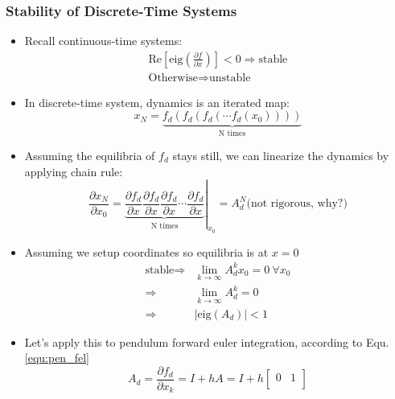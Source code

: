 \subsubsection{Stability of Discrete-Time Systems}
\begin{itemize}
    \item Recall continuous-time systems:
          \begin{align*}
              \text{Re}\left[\text{eig}\left(\frac{\partial f}{\partial x}\right)\right]<0 \Rightarrow \text{stable} \\
              \text{Otherwise} \Rightarrow \text{unstable}
          \end{align*}
    \item In discrete-time system, dynamics is an iterated map:
          \begin{equation}
              x_N = \underset{\text{N times}}{\underbrace{f_d(f_d(f_d(\cdots f_d(x_0))))}}
          \end{equation}
    \item Assuming the equilibria of $f_d$ stays still, we can linearize the dynamics by applying chain rule:
          \begin{equation}
              \frac{\partial x_N}{\partial x_0}=\left.\underset{\text{N times}}{\underbrace{\frac{\partial f_d}{\partial x}\frac{\partial f_d}{\partial x}\frac{\partial f_d}{\partial x}\cdots\frac{\partial f_d}{\partial x}}}\right|_{x_0} = A_d^N
              \text{(not rigorous, why?)}
          \end{equation}
    \item Assuming we setup coordinates so equilibria is at $x = 0$
          \begin{align}
              \text{stable} \Rightarrow & \lim _{k\rightarrow \infty } A_{d}^{k} x_{0} =0\ \forall x_{0} \\
              \Rightarrow               & \lim _{k\rightarrow \infty } A_{d}^{k} =0                      \\
              \Rightarrow               & \left| \text{eig}( A_{d})\right| < 1
          \end{align}
    \item Let's apply this to pendulum forward euler integration, according to Equ. \eqref{equ:pen_fel}
          \begin{equation}
              A_d = \frac{\partial f_d}{\partial x_k} = I + hA = I + h 
              \begin{bmatrix}
                  0                       & 1 \\

\end{bmatrix}
\end{equation}
\end{itemize}
